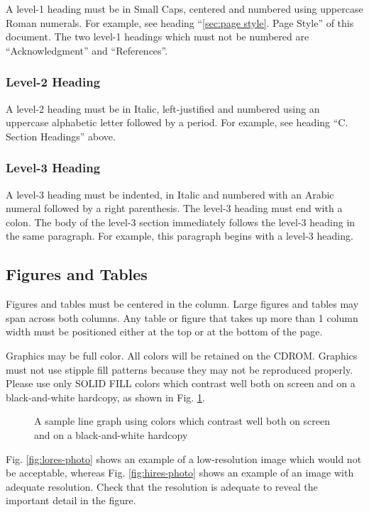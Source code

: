 \documentclass[10pt,conference,a4paper]{IEEEtran}
\begin{document}
A level-1 heading must be in Small Caps, centered and numbered using
uppercase Roman numerals.  For example, see heading ``\ref{sec:page
style}. Page Style'' of this document.  The two level-1 headings which
must not be numbered are ``Acknowledgment'' and ``References''.

\subsubsection{Level-2 Heading}

A level-2 heading must be in Italic, left-justified and numbered using
an uppercase alphabetic letter followed by a period.  For example, see
heading ``C. Section Headings'' above.

\subsubsection{Level-3 Heading}

A level-3 heading must be indented, in Italic and numbered with an
Arabic numeral followed by a right parenthesis. The level-3 heading
must end with a colon.  The body of the level-3 section immediately
follows the level-3 heading in the same paragraph.  For example, this
paragraph begins with a level-3 heading.

\subsection{Figures and Tables}

Figures and tables must be centered in the column.  Large figures and
tables may span across both columns.  Any table or figure that takes
up more than 1 column width must be positioned either at the top or at
the bottom of the page.

Graphics may be full color.  All colors will be retained on the CDROM.
Graphics must not use stipple fill patterns because they may not be
reproduced properly.  Please use only SOLID FILL colors which contrast
well both on screen and on a black-and-white hardcopy, as shown in
Fig.  \ref{fig:sample_graph}.

\begin{figure}[h]
	\centerline{ }
	\caption{A sample line graph using colors which contrast well both on screen and on a black-and-white hardcopy}
	\label{fig:sample_graph}
\end{figure}

Fig. \ref{fig:lores-photo} shows an example of a low-resolution image
which would not be acceptable, whereas Fig.  \ref{fig:hires-photo}
shows an example of an image with adequate resolution.  Check that the
resolution is adequate to reveal the important detail in the figure.
\end{document}
